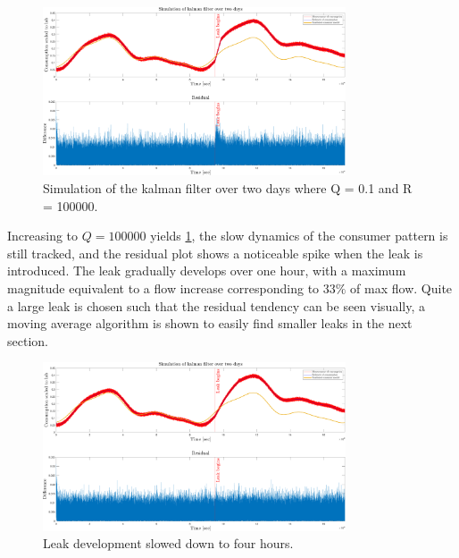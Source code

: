 \begin{figure}[h!]
	\centering
	\includegraphics[width=0.8\textwidth]{Pictures/Kalman_and_Residual_Q01_R100000.pdf}
	
	\caption{Simulation of the kalman filter over two days where Q = 0.1 and R = 100000.}
	\label{fig:Kalman_residual_Q01R100000}
\end{figure}

Increasing to $Q = 100000$ yields \cref{fig:Kalman_residual_Q01R100000}, the slow dynamics of the consumer pattern is still tracked, and the residual plot shows a noticeable spike when the leak is introduced. The leak gradually develops over one hour, with a maximum magnitude equivalent to a flow increase corresponding to $33\%$ of max flow. Quite a large leak is chosen such that the residual tendency can be seen visually, a moving average algorithm is shown to easily find smaller leaks in the next section. 

\begin{figure}[h!]
	\centering
	\includegraphics[width=0.8\textwidth]{Pictures/Kalman_and_Residual_Q01_R100000_4hr.pdf}
	
	\caption{Leak development slowed down to four hours.}
	\label{fig:Kalman_and_Residual_Q01_R100000_4hr}
\end{figure}

